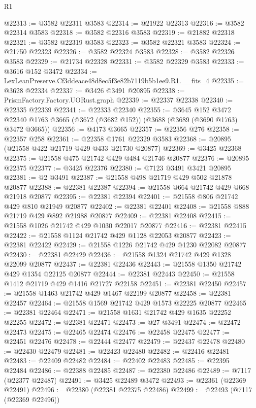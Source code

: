 \begin{lexlean}{R1}
\begin{coremodule}
@22313 := @3582 @22311 @3583
@22314 := @21922 @22313
@22316 := @3582 @22314 @3583
@22318 := @3582 @22316 @3583
@22319 := @21882 @22318
@22321 := @3582 @22319 @3583
@22323 := @3582 @22321 @3583
@22324 := @21750 @22323
@22326 := @3582 @22324 @3583
@22328 := @3582 @22326 @3583
@22329 := @21734 @22328
@22331 := @3582 @22329 @3583
@22333 := @3616 @152 @3472
@22334 := LexLeanPreserve.Cf3ddeace48d8ec5f3e82b7119b5b1ee9.R1.__fits_4
@22335 := @3628 @22334
@22337 := @3426 @3491 @20895
@22338 := PrismFactory.Factory.UORust.graph
@22339 := @22337 @22338
@22340 := @22335 @22339
@22341 := @22333 @22340
@22355 := @3645
    @152
    @3472
    @22340
    @1763
    @3665
    (@3672 (@3682 @152))
    (@3688 (@3689 (@3690 @1763) @3472 @3665))
@22356 := @4173 @3665
@22357 := @22356 @276
@22358 := @22357 @258
@22361 := @22358 @1761 @22329 @3583
@22368 := @20895 (@21558 @422 @21719 @429 @433 @21730 @20877)
@22369 := @3425 @22368
@22375 := @21558 @475 @21742 @429 @484 @21746 @20877
@22376 := @20895 @22375
@22377 := @3425 @22376
@22380 := @7123 @3491 @3421 @20895
@22381 := @2 @3491
@22387 := @21558 @498 @21719 @429 @502 @21878 @20877
@22388 := @22381 @22387
@22394 := @21558 @664 @21742 @429 @668 @21918 @20877
@22395 := @22381 @22394
@22401 := @21558 @806 @21742 @429 @810 @21949 @20877
@22402 := @22381 @22401
@22408 := @21558 @888 @21719 @429 @892 @21988 @20877
@22409 := @22381 @22408
@22415 := @21558 @1026 @21742 @429 @1030 @22017 @20877
@22416 := @22381 @22415
@22422 := @21558 @1124 @21742 @429 @1128 @22053 @20877
@22423 := @22381 @22422
@22429 := @21558 @1226 @21742 @429 @1230 @22082 @20877
@22430 := @22381 @22429
@22436 := @21558 @1324 @21742 @429 @1328 @22099 @20877
@22437 := @22381 @22436
@22443 := @21558 @1350 @21742 @429 @1354 @22125 @20877
@22444 := @22381 @22443
@22450 := @21558 @1412 @21719 @429 @1416 @21727 @22158
@22451 := @22381 @22450
@22457 := @21558 @1463 @21742 @429 @1467 @22199 @20877
@22458 := @22381 @22457
@22464 := @21558 @1569 @21742 @429 @1573 @22225 @20877
@22465 := @22381 @22464
@22471 := @21558 @1631 @21742 @429 @1635 @22252 @22255
@22472 := @22381 @22471
@22473 := @27 @3491
@22474 := @22472 @22473
@22475 := @22465 @22474
@22476 := @22458 @22475
@22477 := @22451 @22476
@22478 := @22444 @22477
@22479 := @22437 @22478
@22480 := @22430 @22479
@22481 := @22423 @22480
@22482 := @22416 @22481
@22483 := @22409 @22482
@22484 := @22402 @22483
@22485 := @22395 @22484
@22486 := @22388 @22485
@22487 := @22380 @22486
@22489 := @7117 (@22377 @22487)
@22491 := @3425 @22489 @3472
@22493 := @22361 (@22369 @22491)
@22496 := @22380 (@22381 @22375 @22486)
@22499 := @22493 (@7117 (@22369 @22496))

\end{coremodule}
\end{lexlean}
